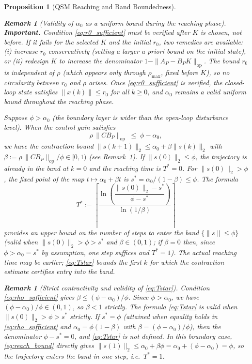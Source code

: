 \documentclass[10pt]{amsart}
\numberwithin{equation}{section}
\newtheorem{proposition}[theorem]{Proposition}
\newtheorem{remark}[theorem]{Remark}
\begin{document}
\begin{proposition}[QSM Reaching and Band Boundedness]
\begin{remark}[Validity of $\alpha_0$ as a uniform bound during the reaching phase]
\textbf{Important.} Condition \eqref{eq:r0_sufficient} must be \emph{verified after}
$K$ is chosen, not before. If it fails for the selected $K$ and the initial $r_0$, two
remedies are available: (i) increase $r_0$ conservatively (setting a larger a priori
bound on the initial state), or (ii) redesign $K$ to increase the denominator
$1 - \|A_P - B_PK\|_{\mathrm{op}}$. The bound $r_0$ is independent of $\rho$ (which
appears only through $\rho_{\max}$, fixed before $K$), so no circularity between $r_0$
and $\rho$ arises. Once \eqref{eq:r0_sufficient} is verified, the closed-loop state
satisfies $\|x(k)\| \leq r_0$ for all $k \geq 0$, and $\alpha_0$ remains a valid
uniform bound throughout the reaching phase.
\end{remark}

Suppose $\phi > \alpha_0$ (the boundary layer is wider than the open-loop disturbance
level). When the control gain satisfies
\begin{equation}\label{eq:rho_sufficient}
  \rho\,\|CB_P\|_{\mathrm{op}} \;\leq\; \phi - \alpha_0,
\end{equation}
we have the contraction bound $\|s(k+1)\|_2 \leq \alpha_0 + \beta\|s(k)\|_2$ with
$\beta := \rho\,\|CB_P\|_{\mathrm{op}}/\phi \in [0,1)$ (see Remark~\ref{rem:beta_strict}).
If $\|s(0)\|_2 \leq \phi$, the trajectory is already in the band at $k=0$ and the
reaching time is $T^* = 0$. For $\|s(0)\|_2 > \phi$, the fixed point of the map
$t\mapsto\alpha_0+\beta t$ is $s^* = \alpha_0/(1-\beta) \leq \phi$. The formula
\begin{equation}\label{eq:Tstar}
  T^* := \left\lceil
    \frac{\ln\!\left(\dfrac{\|s(0)\|_2 - s^*}{\phi - s^*}\right)}{\ln(1/\beta)}
  \right\rceil
\end{equation}
provides an \emph{upper bound} on the number of steps to enter the band
$\{\|s\| \leq \phi\}$ (valid when $\|s(0)\|_2 > \phi > s^*$ and $\beta \in (0,1)$;
if $\beta = 0$ then, since $\phi > \alpha_0 = s^*$ by assumption, one step suffices and
$T^*=1$). The actual reaching time may be earlier; \eqref{eq:Tstar} bounds the first $k$
for which the contraction estimate certifies entry into the band.

\begin{remark}[Strict contractivity and validity of \eqref{eq:Tstar}]
\label{rem:beta_strict}
Condition \eqref{eq:rho_sufficient} gives $\beta \leq (\phi-\alpha_0)/\phi$. Since
$\phi>\alpha_0$, we have $(\phi-\alpha_0)/\phi \in (0,1)$, so $\beta < 1$ strictly.
The formula \eqref{eq:Tstar} is valid when $\|s(0)\|_2 > \phi > s^*$ strictly. If
$s^* = \phi$ (attained when equality holds in \eqref{eq:rho_sufficient} and
$\alpha_0 = \phi(1-\beta)$ with $\beta = (\phi-\alpha_0)/\phi$), then the denominator
$\phi - s^* = 0$, and \eqref{eq:Tstar} is not defined. In this boundary case,
\eqref{eq:reach_bound} directly gives
$\|s(1)\|_2 \leq \alpha_0 + \beta\phi = \alpha_0 + (\phi - \alpha_0) = \phi$, so the
trajectory enters the band in one step, i.e.\ $T^* = 1$.


\end{remark}
\end{proposition}
\end{document}
